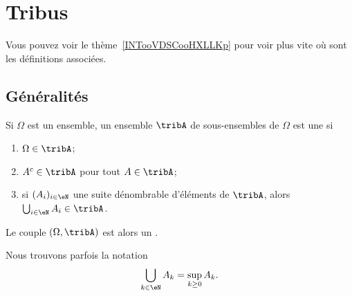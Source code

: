 
\section{Tribus}

Vous pouvez voir le thème~\ref{INTooVDSCooHXLLKp} pour voir plus vite où sont les définitions associées.

\subsection{Généralités}

\begin{definition}  \label{DefjRsGSy}
    Si \( \Omega\) est un ensemble, un ensemble \( \tribA\) de sous-ensembles de \( \Omega\) est une  si
    \begin{enumerate}
        \item
            \( \Omega\in\tribA\);
        \item
            \(  A^c\in \tribA\) pour tout \( A\in\tribA\);
        \item       \label{ItemooPEQNooYiYNtN}
            si \( (A_i)_{i\in \eN}\) une suite dénombrable d'éléments de \( \tribA\), alors \( \bigcup_{i\in \eN}A_i\in\tribA\).
    \end{enumerate}
    Le couple \( (\Omega,\tribA)\) est alors un .
\end{definition}

\begin{remark}
    Nous trouvons parfois la notation
    \begin{equation}
        \bigcup_{k\in \eN}A_k=\sup_{k\geq 0}A_k.
    \end{equation}
\end{remark}

